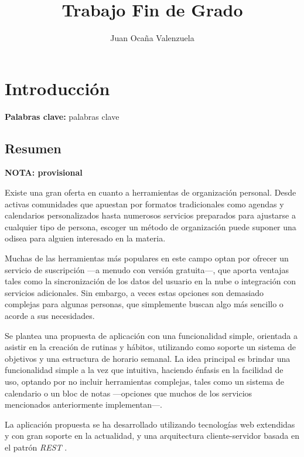 \documentclass[10pt, a4paper]{aqademic}
\author{Juan Ocaña Valenzuela}
\title{Trabajo Fin de Grado}
\begin{document}
\AqMaketitle[%
	cover    = img/logo.png,
	org      = Grado en Ingeniería Informática,
	subtitle = Aplicación de gestión de rutinas semanales basada en tecnologías web
]
\tableofcontents

\chapter{Introducción}

\textbf{Palabras clave:} palabras clave

\section{Resumen}

\textbf{NOTA: provisional}

Existe una gran oferta en cuanto a herramientas de organización personal. Desde activas comunidades que apuestan por formatos tradicionales como agendas y calendarios personalizados hasta numerosos servicios preparados para ajustarse a cualquier tipo de persona, escoger un método de organización puede suponer una odisea para alguien interesado en la materia. 

\medskip

Muchas de las herramientas más populares en este campo optan por ofrecer un servicio de suscripción ---a menudo con versión gratuita---, que aporta ventajas tales como la sincronización de los datos del usuario en la nube o integración con servicios adicionales. Sin embargo, a veces estas opciones son demasiado complejas para algunas personas, que simplemente buscan algo más sencillo o acorde a sus necesidades.

\medskip

Se plantea una propuesta de aplicación con una funcionalidad simple, orientada a asistir en la creación de rutinas y hábitos, utilizando como soporte un sistema de objetivos y una estructura de horario semanal. La idea principal es brindar una funcionalidad simple a la vez que intuitiva, haciendo énfasis en la facilidad de uso, optando por no incluir herramientas complejas, tales como un sistema de calendario o un bloc de notas ---opciones que muchos de los servicios mencionados anteriormente implementan---.

\medskip

La aplicación propuesta se ha desarrollado utilizando tecnologías web extendidas y con gran soporte en la actualidad, y una arquitectura cliente-servidor basada en el patrón \textit{REST} \cite{fielding2000architectural}.
\end{document}
